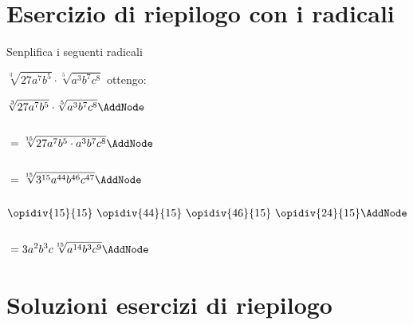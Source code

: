 \section{Esercizio di riepilogo con i radicali}
Senplifica i seguenti radicali
\tcbstartrecording
\begin{exercise}
	$\sqrt[3]{27a^7b^5}\cdot\sqrt[5]{a^3b^7c^8}$
	\tcblower
	ottengo:
	\begin{NodesList}
		\begin{align*}
		&\sqrt[3]{27a^7b^5}\cdot\sqrt[5]{a^3b^7c^8}  \AddNode\\
		&\\
		&=\sqrt[15]{27a^7b^5\cdot a^3b^7c^8}  \AddNode\\
		&\\
		&=\sqrt[15]{3^{15}a^{44}b^{46}c^{47}}  \AddNode\\
		&\\
		&\opidiv{15}{15}\ \opidiv{44}{15}\ \opidiv{46}{15}\ \opidiv{24}{15}  \AddNode\\
		&\\
		&=3a^2b^3c\sqrt[15]{a^{14}b^{3}c^{9}}  \AddNode
		\end{align*}
				\end{NodesList}
			\end{exercise}
\tcbstoprecording
\newpage
\section{Soluzioni esercizi di riepilogo}
\tcbinputrecords				